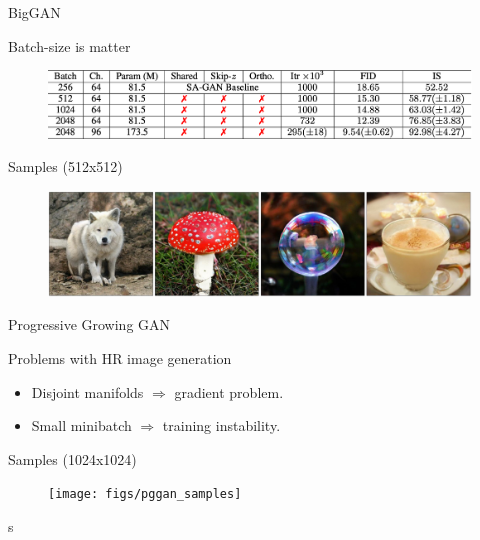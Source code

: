 \begin{frame}{BigGAN}
	\begin{block}{Batch-size is matter}
		\begin{figure}
			\centering
			\includegraphics[width=\linewidth]{figs/biggan_results}
		\end{figure}
	\end{block}
	\begin{block}{Samples (512x512)}
		\begin{figure}
			\centering
			\includegraphics[width=\linewidth]{figs/biggan_samples}
		\end{figure}
	\end{block}
	\vspace{-0.4cm}
\end{frame}
\begin{frame}{Progressive Growing GAN}
	\begin{block}{Problems with HR image generation}
		\begin{itemize}
			\item Disjoint manifolds $\Rightarrow$ gradient problem.
			\item Small minibatch $\Rightarrow$ training instability.
		\end{itemize}
	\end{block}
	\vspace{-0.2cm}
	\begin{block}{Samples (1024x1024)}
		\vspace{-0.2cm}
		\begin{figure}
			\texttt{[image: figs/pggan\_samples]}
		\end{figure}
	\end{block}
s\end{frame}
